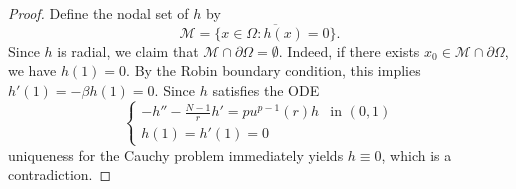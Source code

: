 \documentclass[10pt,a4paper]{amsart}
\begin{document}
\begin{proof}
Define the nodal set of $h$ by
$$
\mathcal{M}=\overline{\{x\in\Omega : h(x)=0\}}.
$$
% 
Since $h$ is radial, we claim that $\mathcal{M}\cap \partial\Omega=\emptyset$. Indeed, if there exists $x_0 \in \mathcal{M} \cap \partial\Omega$, we have $h(1)=0$. By the Robin boundary condition, this implies $h'(1)=-\beta h(1)=0$. Since $h$ satisfies the ODE
$$\begin{cases}
-h''-\frac{N-1}rh'=pu^{p-1}(r)h&\text{in }(0,1)\\
h(1)=h'(1)=0
\end{cases}
$$
uniqueness for the Cauchy problem immediately yields $h \equiv 0$, which is a contradiction.
 





\end{proof}
\end{document}
